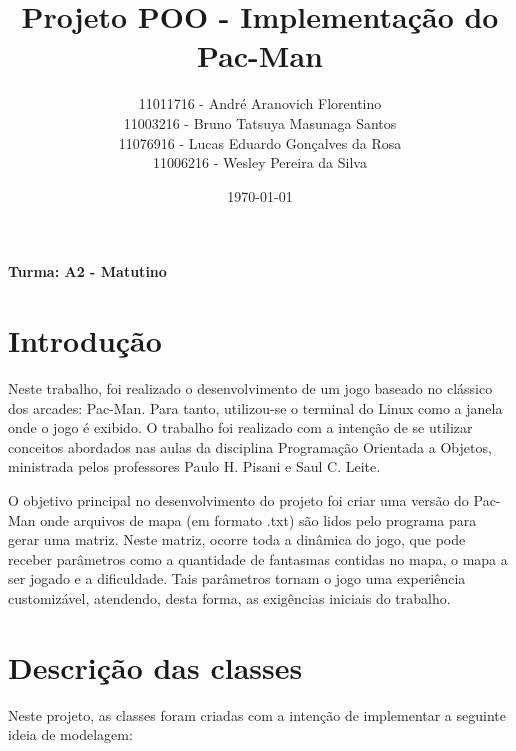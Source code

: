 \documentclass[]{article}
\title{Projeto POO - Implementação do Pac-Man}
\author{11011716 - André Aranovich Florentino\\ 11003216 - Bruno Tatsuya Masunaga Santos\\ 11076916 - Lucas Eduardo Gonçalves da Rosa\\ 11006216 - Wesley Pereira da Silva}
\date{\today}
\begin{document}
\maketitle

\centerline{\textbf{Turma: A2 - Matutino}}

\section{Introdução}

Neste trabalho, foi realizado o desenvolvimento de um jogo baseado no clássico dos arcades: Pac-Man. Para tanto, utilizou-se o terminal do Linux como a janela onde o jogo é exibido. O trabalho foi realizado com a intenção de se utilizar conceitos abordados nas aulas da disciplina Programação Orientada a Objetos, ministrada pelos professores Paulo H. Pisani e Saul C. Leite.

O objetivo principal no desenvolvimento do projeto foi criar uma versão do Pac-Man onde arquivos de mapa (em formato .txt) são lidos pelo programa para gerar uma matriz. Neste matriz, ocorre toda a dinâmica do jogo, que pode receber parâmetros como a quantidade de fantasmas contidas no mapa, o mapa a ser jogado e a dificuldade. Tais parâmetros tornam o jogo uma experiência customizável, atendendo, desta forma, as exigências iniciais do trabalho.

\section{Descrição das classes}
Neste projeto, as classes foram criadas com a intenção de implementar a seguinte ideia de modelagem: 
\end{document}
